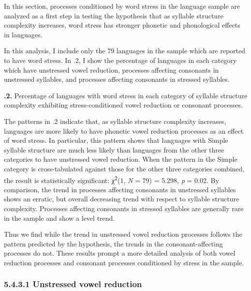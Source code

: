   In this section, processes conditioned by word stress in the language sample are analyzed as a first step in testing the hypothesis that as syllable structure complexity increases, word stress has stronger phonetic and phonological effects in languages.



  In this analysis, I include only the 79 languages in the sample which are reported to have word stress. In .2, I show the percentage of languages in each category which have unstressed vowel reduction, processes affecting consonants in unstressed syllables, and processes affecting consonants in stressed syllables.





\textbf{.2.} Percentage of languages with word stress in each category of syllable structure complexity exhibiting stress-conditioned vowel reduction or consonant processes.



  The patterns in .2 indicate that, as syllable structure complexity increases, languages are more likely to have phonetic vowel reduction processes as an effect of word stress. In particular, this pattern shows that languages with Simple syllable structure are much less likely than languages from the other three categories to have unstressed vowel reduction. When the pattern in the Simple category is cross-tabulated against those for the other three categories combined, the result is statistically significant: χ\textsuperscript{2}(1, \textit{N} = 79) = 5.298, \textit{p} = 0.02. By comparison, the trend in processes affecting consonants in unstressed syllables shows an erratic, but overall decreasing trend with respect to syllable structure complexity. Processes affecting consonants in stressed syllables are generally rare in the sample and show a level trend. 



  Thus we find while the trend in unstressed vowel reduction processes follows the pattern predicted by the hypothesis, the trends in the consonant-affecting processes do not. These results prompt a more detailed analysis of both vowel reduction processes and consonant processes conditioned by stress in the sample.


\subsubsection{\textbf{5.4.3.1} \textbf{Unstressed} \textbf{vowel} \textbf{reduction}}

